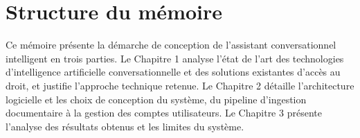 \section*{Structure du mémoire}

Ce mémoire présente la démarche de conception de l'assistant conversationnel intelligent en trois parties. Le Chapitre 1 analyse l'état de l'art des technologies d'intelligence artificielle conversationnelle et des solutions existantes d'accès au droit, et justifie l'approche technique retenue. Le Chapitre 2 détaille l'architecture logicielle et les choix de conception du système, du pipeline d'ingestion documentaire à la gestion des comptes utilisateurs. Le Chapitre 3 présente l'analyse des résultats obtenus et les limites du système.